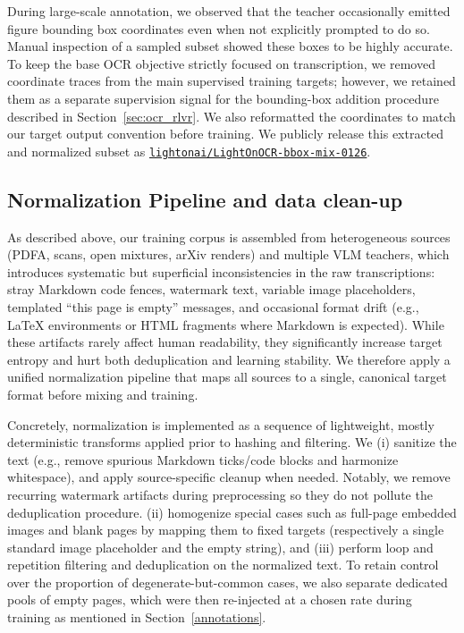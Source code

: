 \documentclass{article}
\begin{document}
During large-scale annotation, we observed that the teacher occasionally emitted figure bounding box coordinates even when not explicitly prompted to do so. Manual inspection of a sampled subset showed these boxes to be highly accurate. To keep the base OCR objective strictly focused on transcription, we removed coordinate traces from the main supervised training targets; however, we retained them as a separate supervision signal for the bounding-box addition procedure described in Section~\ref{sec:ocr_rlvr}. We also reformatted the coordinates to match our target output convention before training. We publicly release this extracted and normalized subset as \texttt{\href{https://huggingface.co/datasets/lightonai/LightOnOCR-bbox-mix-0126}{lightonai/LightOnOCR-bbox-mix-0126}}.

\subsection{Normalization Pipeline and data clean-up}
\label{sec:normalization}
As described above, our training corpus is assembled from heterogeneous sources (PDFA, scans, open mixtures, arXiv renders) and multiple VLM teachers, which introduces systematic but superficial inconsistencies in the raw transcriptions: stray Markdown code fences, watermark text, variable image placeholders, templated ``this page is empty'' messages, and occasional format drift (e.g., \LaTeX{} environments or HTML fragments where Markdown is expected). While these artifacts rarely affect human readability, they significantly increase target entropy and hurt both deduplication and learning stability. We therefore apply a unified normalization pipeline that maps all sources to a single, canonical target format before mixing and training.

Concretely, normalization is implemented as a sequence of lightweight, mostly deterministic transforms applied prior to hashing and filtering. We (i) sanitize the text (e.g., remove spurious Markdown ticks/code blocks and harmonize whitespace), and apply source-specific cleanup when needed. Notably, we remove recurring watermark artifacts during preprocessing so they do not pollute the deduplication procedure. (ii) homogenize special cases such as full-page embedded images and blank pages by mapping them to fixed targets (respectively a single standard image placeholder and the empty string), and (iii) perform loop and repetition filtering and deduplication on the normalized text. To retain control over the proportion of degenerate-but-common cases, we also separate dedicated pools of empty pages, which were then re-injected at a chosen rate during training as mentioned in Section~\ref{annotations}.
\end{document}
